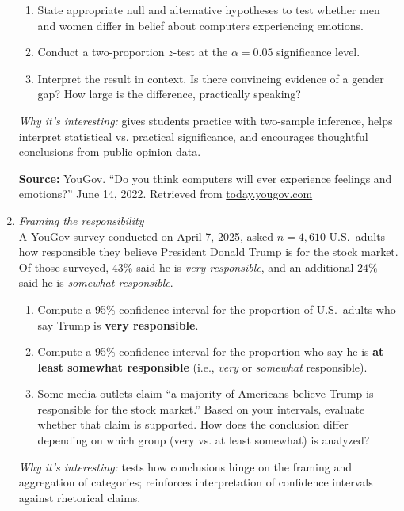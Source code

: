 \documentclass[11pt]{article}
\begin{document}
\begin{enumerate}[label=\textbf{Q\,\arabic*:}, left=0pt]
      \begin{enumerate}[label=(\alph*)]
         \item State appropriate null and alternative hypotheses to test whether men and women differ in belief about computers experiencing emotions.
         \item Conduct a two-proportion $z$-test at the $\alpha = 0.05$ significance level.
         \item Interpret the result in context. Is there convincing evidence of a gender gap? How large is the difference, practically speaking?
      \end{enumerate}
      \textit{Why it’s interesting:} gives students practice with two-sample inference, helps interpret statistical vs. practical significance, and encourages thoughtful conclusions from public opinion data.

      \vspace{0.5em}
      \noindent\textbf{Source:} YouGov. “Do you think computers will ever experience feelings and emotions?” June 14, 2022. Retrieved from \href{https://today.yougov.com/}{today.yougov.com}


\item  \emph{Framing the responsibility} \\
      A YouGov survey conducted on April 7, 2025, asked $n = 4{,}610$ U.S.\ adults how responsible they believe President Donald Trump is for the stock market. Of those surveyed, $43\%$ said he is \emph{very responsible}, and an additional $24\%$ said he is \emph{somewhat responsible}.
      \begin{enumerate}[label=(\alph*)]
         \item Compute a 95\% confidence interval for the proportion of U.S.\ adults who say Trump is \textbf{very responsible}.  
         \item Compute a 95\% confidence interval for the proportion who say he is \textbf{at least somewhat responsible} (i.e., \emph{very} or \emph{somewhat} responsible).  
         \item Some media outlets claim “a majority of Americans believe Trump is responsible for the stock market.” Based on your intervals, evaluate whether that claim is supported. How does the conclusion differ depending on which group (very vs. at least somewhat) is analyzed?
      \end{enumerate}
      \textit{Why it’s interesting:} tests how conclusions hinge on the framing and aggregation of categories; reinforces interpretation of confidence intervals against rhetorical claims.


\end{enumerate}
\end{document}
